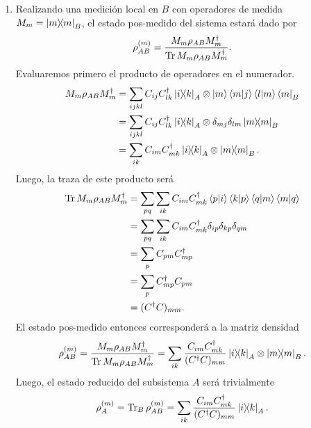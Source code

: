 \documentclass{scrartcl}
\DeclareRobustCommand{\[}{\begin{equation}}
\DeclareRobustCommand{\]}{\end{equation}}
\begin{document}
\begin{enumerate}
\begin{enumerate}
        
        \item Realizando una medición local en $B$ con operadores de medida $M_m = \dyad{m}{m}_B$, el estado pos-medido del sistema estará dado por
        \[ \rho^{(m)}_{AB} = \frac{M_m \rho_{AB} M_m^\dagger}{\Tr M_m \rho_{AB} M_m^\dagger}. \]
        Evaluaremos primero el producto de operadores en el numerador.
        \begin{align}
            M_m \rho_{AB} M_m^\dagger &= \sum_{ijkl} C_{ij} C_{lk}^\dagger \dyad{i}{k}_A \otimes \ket{m}\bra{m} \ket{j}\bra{l} \ket{m}\bra{m}_B \\
                &= \sum_{ijkl} C_{ij} C_{lk}^\dagger \dyad{i}{k}_A \otimes \delta_{mj} \delta_{lm} \dyad{m}{m}_B \\
                &= \sum_{ik} C_{im} C_{mk}^\dagger \dyad{i}{k}_A \otimes \dyad{m}{m}_B.
        \end{align}
        Luego, la traza de este producto será
        \begin{align}
            \Tr M_m \rho_{AB} M_m^\dagger &= \sum_{pq} \sum_{ik} C_{im} C_{mk}^\dagger \bra{p}\ket{i}\bra{k}\ket{p} \bra{q}\ket{m}\bra{m}\ket{q} \\
                &= \sum_{pq} \sum_{ik} C_{im} C_{mk}^\dagger \delta_{ip} \delta_{kp} \delta_{qm} \\
                &= \sum_{p} C_{pm} C_{mp}^\dagger \\
                &= \sum_{p} C_{mp}^\dagger C_{pm} \\
                &= (C^\dagger C)_{mm}.
        \end{align}
        El estado pos-medido entonces corresponderá a la matriz densidad
        \[ \rho^{(m)}_{AB} = \frac{M_m \rho_{AB} M_m^\dagger}{\Tr M_m \rho_{AB} M_m^\dagger} = \sum_{ik} \frac{C_{im} C_{mk}^\dagger}{(C^\dagger C)_{mm}} \dyad{i}{k}_A \otimes \dyad{m}{m}_B. \]
        Luego, el estado reducido del subsistema $A$ será trivialmente
        \[ \rho^{(m)}_A = \Tr_B \rho^{(m)}_{AB} = \sum_{ik} \frac{C_{im} C_{mk}^\dagger}{(C^\dagger C)_{mm}} \dyad{i}{k}_A. \]
        

\end{enumerate}
\end{enumerate}
\end{document}
